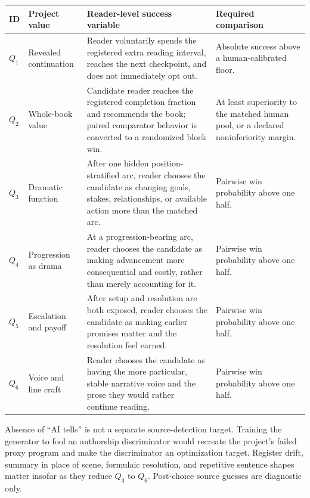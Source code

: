 \documentclass[11pt]{article}
\theoremstyle{remark}
\begin{document}
\begin{center}
\footnotesize
\begin{tabular}{p{}p{}p{}p{}}
\toprule
ID & Project value & Reader-level success variable & Required comparison \\
\midrule
$Q_1$ & Revealed continuation & Reader voluntarily spends the registered extra reading
interval, reaches the next checkpoint, and does not immediately opt out. & Absolute success
above a human-calibrated floor. \\

$Q_2$ & Whole-book value & Candidate reader reaches the registered completion fraction and
recommends the book; paired comparator behavior is converted to a randomized block win. & At
least superiority to the matched human pool, or a declared noninferiority margin. \\

$Q_3$ & Dramatic function & After one hidden position-stratified arc, reader chooses the
candidate as changing goals, stakes, relationships, or available action more than the matched
arc. & Pairwise win probability above one half. \\

$Q_4$ & Progression as drama & At a progression-bearing arc, reader chooses the candidate as
making advancement more consequential and costly, rather than merely accounting for it. &
Pairwise win probability above one half. \\

$Q_5$ & Escalation and payoff & After setup and resolution are both exposed, reader chooses
the candidate as making earlier promises matter and the resolution feel earned. & Pairwise
win probability above one half. \\

$Q_6$ & Voice and line craft & Reader chooses the candidate as having the more particular,
stable narrative voice and the prose they would rather continue reading. & Pairwise win
probability above one half. \\
\bottomrule
\end{tabular}
\end{center}

Absence of ``AI tells'' is not a separate source-detection target. Training the generator to
fool an authorship discriminator would recreate the project's failed proxy program and make
the discriminator an optimization target. Register drift, summary in place of scene,
formulaic resolution, and repetitive sentence shapes matter insofar as they reduce $Q_3$ to
$Q_6$. Post-choice source guesses are diagnostic only.
\end{document}

